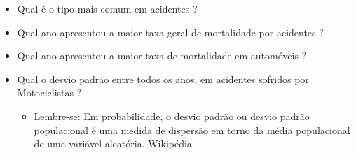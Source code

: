 \documentclass[12pt]{article}
\begin{document}
\begin{itemize}
    \item Qual é o tipo mais comum em acidentes ?
    \item Qual ano apresentou a maior taxa geral de mortalidade por acidentes ?
    \item Qual ano apresentou a maior taxa de mortalidade em automóveis ?
    \item Qual o desvio padrão entre todos os anos, em acidentes sofridos por Motociclistas ?
    	\begin{itemize}
    		\item Lembre-se: Em probabilidade, o desvio padrão ou desvio padrão populacional é uma medida de dispersão em torno da média populacional de uma variável aleatória. Wikipédia
    	\end{itemize}
\end{itemize}




% 
% 
\end{document}
